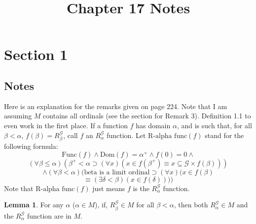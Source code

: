 \documentclass{article}
\title{Chapter 17 Notes}
\theoremstyle{definition}
\newtheorem{lemma}[theorem]{Lemma}
\begin{document}
\date{}
\maketitle

\section*{Section 1}

\subsection*{Notes}
Here is an explanation for the remarks given on page 224. Note that I am assuming $M$ contains all ordinals (see the section for 
Remark 3). 
Definition 1.1 to even work in the first place. If a function $f$ has domain $\alpha$, and is such that, for all $\beta<\alpha$, 
$f(\beta)=R^\mathcal{G}_\beta$, call $f$ an $R^\mathcal{G}_\alpha$ function. Let $\textrm{R-alpha func}(f)$ stand for the following formula:
\[ \textrm{Func}(f)\wedge\textrm{Dom}(f)=\alpha^+\wedge f(0)=0\wedge \]
\[ (\forall\beta\le\alpha)(\beta^+<\alpha\supset(\forall x)(x\in f(\beta^+)\equiv x\subseteq\mathcal{G}\times f(\beta))) \]
\[ \wedge (\forall\beta<\alpha)(\textrm{beta is a limit ordinal}\supset(\forall x)(x\in f(\beta) \]
\[ \equiv(\exists\delta<\beta)(x\in f(\delta)))) \]
Note that $\textrm{R-alpha func}(f)$ just means $f$ is the $R^\mathcal{G}_\alpha$ function.

\begin{lemma}
For any $\alpha$ ($\alpha\in M$), if, $R^\mathcal{G}_\beta\in M$ for all $\beta<\alpha$, then 
both $R^\mathcal{G}_\alpha\in M$ and the $R^\mathcal{G}_\alpha$ function are in $M$. 
\end{lemma}
\end{document}
